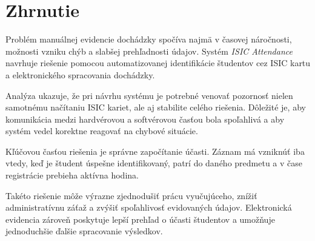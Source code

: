 \section{Zhrnutie}
\label{sec:problem-analysis-summary}

Problém manuálnej evidencie dochádzky spočíva najmä v časovej náročnosti, možnosti vzniku chýb a slabšej prehľadnosti údajov. Systém \textit{ISIC Attendance} navrhuje riešenie pomocou automatizovanej identifikácie študentov cez ISIC kartu a elektronického spracovania dochádzky.

Analýza ukazuje, že pri návrhu systému je potrebné venovať pozornosť nielen samotnému načítaniu ISIC kariet, ale aj stabilite celého riešenia. Dôležité je, aby komunikácia medzi hardvérovou a softvérovou časťou bola spoľahlivá a aby systém vedel korektne reagovať na chybové situácie.

Kľúčovou časťou riešenia je správne započítanie účasti. Záznam má vzniknúť iba vtedy, keď je študent úspešne identifikovaný, patrí do daného predmetu a v čase registrácie prebieha aktívna hodina.

Takéto riešenie môže výrazne zjednodušiť prácu vyučujúceho, znížiť administratívnu záťaž a zvýšiť spoľahlivosť evidovaných údajov. Elektronická evidencia zároveň poskytuje lepší prehľad o účasti študentov a umožňuje jednoduchšie ďalšie spracovanie výsledkov.